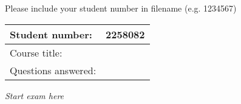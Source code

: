 \documentclass[]{article}
\author{Stuart Reilly 2258082}
\date{\today}
\begin{document}
Please include your student number in filename (e.g. 1234567)

\begin{tabulary}{0.7\textwidth}{LL}
	\toprule
	Student number: & 2258082 \\
	\midrule
	Course title: & \\
	\midrule
	Questions answered: & \\
	\bottomrule
\end{tabulary}
\pagebreak

\emph{Start exam here}
\end{document}
